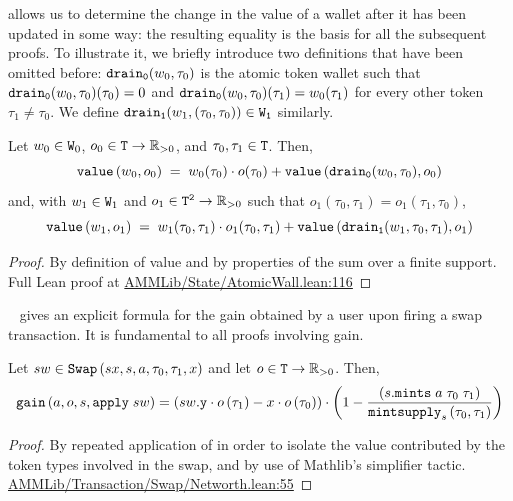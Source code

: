  allows us to determine the change in the value of a wallet after it has been updated in some way: the resulting equality is the basis for all the subsequent proofs. To illustrate it, we briefly introduce two definitions that have been omitted before: $\code{drain_0}(w_0, \tau_0)$ is the atomic token wallet such that $\code{drain_0}(w_0, \tau_0)(\tau_0) = 0$ and $\code{drain_0}(w_0, \tau_0)(\tau_1) = w_0(\tau_1)$ for every other token $\tau_1 \neq \tau_0$. We define $\code{drain_1}(w_1, (\tau_0, \tau_0)) \in \code{W_1}$ similarly.
\begin{lemma}
  \label{th:valueexp}
Let $w_0 \in \code{W}_0$, $o_0 \in \code{T} \to \mathbb R_{>0}$, and $\tau_0, \tau_1 \in \code{T}$. Then, 
$$
\code{value}\left(w_0, o_0\right) \; = \; w_0(\tau_0)\cdot o(\tau_0) + \code{value}\left(\code{drain_0}(w_0, \tau_0), o_0\right)
$$
and, with $w_1 \in \code{W}_1$ and $o_1 \in \code{T^2} \to \mathbb R_{>0}$ such that $o_1(\tau_0, \tau_1) = o_1(\tau_1, \tau_0)$,
$$
\code{value}\left(w_1, o_1\right) \; = \; w_1(\tau_0, \tau_1)\cdot o_1(\tau_0, \tau_1) + \code{value}\left(\code{drain_1}(w_1, \tau_0, \tau_1), o_1\right)
$$  
\end{lemma}
\begin{proof} By definition of value and by properties of the sum over a finite support. Full Lean proof at \href{https://github.com/danielepusceddu/lean4-amm/blob/paper/AMMLib/State/AtomicWall.lean#L116}{AMMLib/State/AtomicWall.lean:116}
\end{proof}

~ gives an explicit formula for the gain obtained by a user upon firing a swap transaction. It is fundamental to all proofs involving gain.
\begin{lemma}
\label{th:swapgain}
Let $sw \in \code{Swap}\left(sx,s,a,\tau_0,\tau_1,x\right)$ and 
let $o \in \code{T} \to \mathbb R_{>0}$. Then, 
$$\code{gain}\left(a, o, s, \code{apply} \; sw \right) = \left(sw\code{.y}\cdot o\left(\tau_1\right) - x \cdot o\left(\tau_0\right)\right)
  \cdot \left(1 - \frac{\left(s\code{.mints} \; a \; \tau_0 \; \tau_1\right)}{\code{mintsupply}_s\left(\tau_0,\tau_1\right)}\right)
$$
\end{lemma}
\begin{proof} By repeated application of  in order to isolate the value contributed by the token types involved in the swap, and by use of Mathlib's  simplifier tactic. \href{https://github.com/danielepusceddu/lean4-amm/blob/paper/AMMLib/Transaction/Swap/Networth.lean#L55}{AMMLib/Transaction/Swap/Networth.lean:55}
\end{proof}

